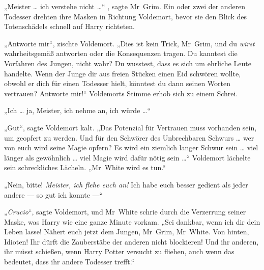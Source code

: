 „Meister … ich verstehe nicht …“ , sagte Mr~Grim.
Ein oder zwei der anderen Todesser drehten ihre Masken in Richtung Voldemort, bevor sie den Blick des Totenschädels schnell auf Harry richteten.

„Antworte mir“, zischte Voldemort.
„Dies ist kein Trick, Mr~Grim, und du \emph{wirst} wahrheitsgemäß antworten oder die Konsequenzen tragen. Du kanntest die Vorfahren des Jungen, nicht wahr? Du wusstest, dass es sich um ehrliche Leute handelte. Wenn der Junge dir aus freien Stücken einen Eid schwören wollte, obwohl er dich für einen Todesser hielt, könntest du dann seinen Worten vertrauen? Antworte mir!“
Voldemorts Stimme erhob sich zu einem Schrei.

„Ich … ja, Meister, ich nehme an, ich würde …“

„Gut“, sagte Voldemort kalt.
„Das Potenzial für Vertrauen muss vorhanden sein, um geopfert zu werden. Und für den Schwörer des Unbrechbaren Schwurs … wer von euch wird seine Magie opfern? Es wird ein ziemlich langer Schwur sein … viel länger als gewöhnlich … viel Magie wird dafür nötig sein …“
Voldemort lächelte sein schreckliches Lächeln.
„Mr~White wird es tun.“

„Nein, bitte! \emph{Meister, ich flehe euch an!} Ich habe euch besser gedient als jeder andere — so gut ich konnte —“

„\emph{Crucio}“, sagte Voldemort, und Mr~White schrie durch die Verzerrung seiner Maske, was Harry wie eine ganze Minute vorkam.
„Sei dankbar, wenn ich dir dein Leben lasse! Nähert euch jetzt dem Jungen, Mr~Grim, Mr~White. Von hinten, Idioten! Ihr dürft die Zauberstäbe der anderen nicht blockieren! Und ihr anderen, ihr müsst schießen, wenn Harry Potter versucht zu fliehen, auch wenn das bedeutet, dass ihr andere Todesser trefft.“

